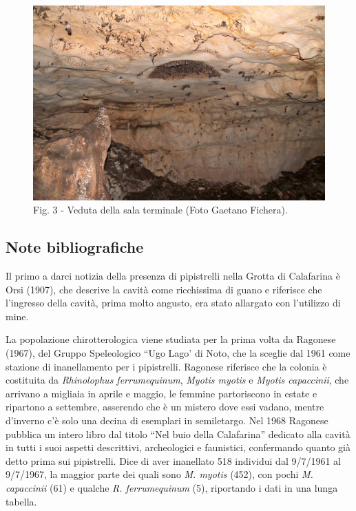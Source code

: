\begin{multicols}{2}
\begin{figure}[t] %
  \centering\small
  \includegraphics[width=\linewidth]{abstracts/extended_abstracts/C018_Figure3.png}
  \caption*{Fig. 3 - Veduta della sala terminale (Foto Gaetano Fichera).}
\end{figure}

\subsection*{Note bibliografiche}
Il primo a darci notizia della presenza di pipistrelli nella Grotta di Calafarina è Orsi (1907), che descrive la cavità come ricchissima di guano e riferisce che l’ingresso della cavità, prima molto angusto, era stato allargato con l'utilizzo di mine.

La popolazione chirotterologica viene studiata per la prima volta da Ragonese (1967), del Gruppo Speleologico ``Ugo Lago'  di Noto, che la sceglie dal 1961 come stazione di inanellamento per i pipistrelli. Ragonese riferisce che la colonia è costituita da \emph{Rhinolophus ferrumequinum}, \emph{Myotis myotis} e \emph{Myotis capaccinii}, che arrivano a migliaia in aprile e maggio, le femmine partoriscono in estate e ripartono a settembre, asserendo che è un mistero dove essi vadano, mentre d'inverno c'è solo una decina di esemplari in semiletargo. Nel 1968 Ragonese pubblica un intero libro dal titolo ``Nel buio della Calafarina'' dedicato alla cavità in tutti i suoi aspetti descrittivi, archeologici e faunistici, confermando quanto già detto prima sui pipistrelli. Dice di aver inanellato 518 individui dal 9/7/1961 al 9/7/1967, la maggior parte dei quali sono \emph{M. myotis} (452), con pochi \emph{M. capaccinii} (61) e qualche  \emph{R. ferrumequinum} (5), riportando i dati in una lunga tabella.


\end{multicols}
